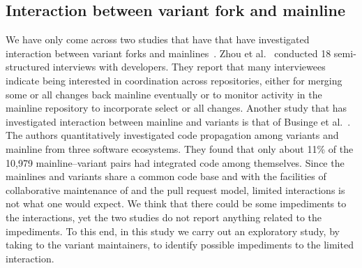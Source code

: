 \subsection{Interaction between variant fork and mainline}
We have only come across two studies that have that have investigated interaction between variant forks and mainlines~\cite{Zhou:2020,businge:emse:2021}.
Zhou et al.~\cite{Zhou:2020} conducted 18 semi-structured interviews with developers. They report that many interviewees indicate being interested in coordination across repositories, either for merging some or all changes back mainline eventually or to monitor activity in the mainline repository to incorporate select or all changes. 
Another study that has investigated interaction between mainline and variants is that of Businge et al.~\cite{businge:emse:2021}.
The authors quantitatively investigated code propagation among variants and mainline from three software ecosystems. They found that only about 11\% of the 10,979 mainline--variant pairs had integrated code among themselves. 
Since the mainlines and variants share a common code base and with the facilities of collaborative maintenance of \git and the pull request model, limited interactions is not what one would expect. We think that there could be some impediments to the interactions, yet the two studies do not report anything related to the impediments. To this end, in this study we carry out an exploratory study, by taking to the variant maintainers, to identify possible impediments to the limited interaction.


